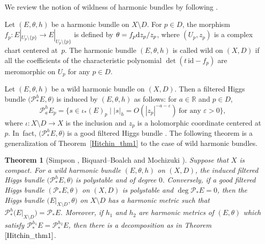 \documentclass[pdftex]{sigma}
\numberwithin{equation}{section}
\newtheorem{Theorem}{Theorem}[section]
\newcommand{\R}{\mathbb{R}}
\newcommand{\id}{\mathrm{id}}
\begin{document}
We review the notion of wildness of harmonic bundles by following \cite{Mo1}.
\begin{Definition}
 Let $(E,\theta,h)$ be a harmonic bundle on $X\setminus D$. For $p\in D$, the morphism $f_p\colon E|_{U_p\setminus\{p\}}\to E|_{U_p \setminus\{p\}}$ is defined by $\theta = f_p {\rm d}z_p/z_p$, where $(U_p,z_p)$ is a complex chart centered at~$p$. The harmonic bundle $(E,\theta,h)$ is called wild on $(X,D)$ if all the coefficients of the characteristic polynomial $\det(t\,\id- f_p)$ are meromorphic on $U_p$ for any $p\in D$.
\end{Definition}
Let $(E,\theta,h)$ be a wild harmonic bundle on $(X,D)$. Then a filtered Higgs bundle $\bigl(\mathcal{P}_{*}^{h} E,\theta\bigr)$ is induced by $(E,\theta,h)$ as follows: for $a\in\R$ and $p\in D$,
\begin{equation}\label{induced_wild_harmonic_bundle}
 \mathcal{P}_{a}^{h} E_p = \{s\in \iota_{*}(E)_p \mid |s|_h = O(|z_p|^{-a-\varepsilon})\ \text{for any $\varepsilon>0$} \},
\end{equation}
where $\iota\colon X\setminus D\to X$ is the inclusion and $z_p$ is a holomorphic coordinate centered at $p$. In~fact, $\bigl(\mathcal{P}_{*}^{h} E,\theta\bigr)$ is a good filtered Higgs bundle \cite{Mo1}. The following theorem is a generalization of Theorem~\ref{Hitchin_thm1} to the case of wild harmonic bundles.
\begin{Theorem}[Simpson \cite{Si2}, Biquard--Boalch \cite{BB} and Mochizuki \cite{Mo1}]\label{Hitchin_thm2}
 Suppose that $X$ is compact. For a wild harmonic bundle $(E,\theta,h)$ on $(X,D)$, the induced filtered Higgs bundle $\bigl(\mathcal{P}_{*}^{h} E,\theta\bigr)$ is polystable and of degree $0$. Conversely, if a good filtered Higgs bundle $(\mathcal{P}_{*} E,\theta)$ on $(X,D)$ is polystable and $\deg{\mathcal{P}_{*}E}=0$, then the Higgs bundle $\bigl(E|_{X\setminus D},\theta\bigr)$ on $X\setminus D$ has a harmonic metric such that $\mathcal{P}_{*}^h \bigl(E|_{X\setminus D}\bigr) =\mathcal{P}_{*}E $. Moreover, if $h_1$ and $h_2$ are harmonic metrics of $(E,\theta)$ which satisfy $\mathcal{P}_{*}^{h_1} E = \mathcal{P}_{*}^{h_2} E$, then there is a decomposition as in Theorem $\ref{Hitchin_thm1}$.
\end{Theorem}
\end{document}
